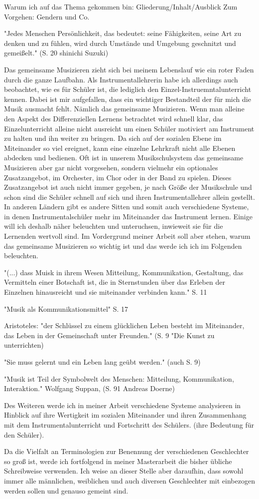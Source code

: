 

Warum ich auf das Thema gekommen bin:
Gliederung/Inhalt/Ausblick
Zum Vorgehen: Gendern und Co. 


"Jedes Menschen Persönlichkeit, das bedeutet: seine Fähigkeiten, seine Art zu
denken und zu fühlen, wird durch Umstände und Umgebung geschnitzt und
gemeißelt." (S. 20 shinichi Suzuki)

Das gemeinsame Musizieren zieht sich bei meinem Lebenslauf wie ein roter Faden
durch die ganze Laufbahn. Als Instrumentallehrerin habe ich allerdings auch
beobachtet, wie es für Schüler ist, die lediglich den
Einzel-Instruemntalunterricht kennen. Dabei ist mir aufgefallen, dass ein
wichtiger Bestandteil der für mich die Musik ausmacht fehlt. Nämlich das
gemeinsame Musizieren. Wenn man alleine den Aspekt des
Differenziellen Lernens betrachtet wird schnell klar, das Einzelunterricht
alleine nicht ausreicht um einen Schüler motiviert am Instrument zu halten und
ihn weiter zu bringen. Da sich auf der sozialen Ebene im Miteinander so viel
ereignet, kann eine einzelne Lehrkraft nicht alle Ebenen abdecken und bedienen.
Oft ist in unserem Musikschulsystem das gemeinsame Musizieren aber gar nicht
vorgesehen, sondern vielmehr ein optionales Zusatzangebot, im Orchester, im Chor
oder in der Band zu spielen. Dieses Zusatzangebot ist auch nicht immer gegeben,
je nach Größe der Musikschule und schon sind die Schüler schnell auf sich und
ihren Instrumentallehrer allein gestellt. In anderen Ländern gibt es andere
Sitten und somit auch verschiedene Systeme, in denen Instrumentalschüler mehr im
Miteinander das Instrument lernen. Einige will ich deshalb näher beleuchten und
unteruchsen, inwieweit sie für die Lernenden wertvoll sind. Im Vordergrund
meiner Arbeit soll aber stehen, warum das gemeinsame Musizieren so
wichtig ist und das werde ich ich im Folgenden beleuchten. 


"(...) dass Muisk in ihrem Wesen Mitteilung, Kommunikation, Gestaltung, das
Vermitteln einer Botschaft ist, die in Sternstunden über das Erleben der
Einzelnen hinausreicht und sie miteinander verbinden kann." S. 11

"Musik als Kommunikationsmittel" S. 17

Aristoteles: "der Schlüssel zu einem glücklichen Leben besteht im Miteinander,
das Leben in der Gemeinschaft unter Freunden." (S. 9 "Die Kunst zu unterrichten)

"Sie muss gelernt und ein Leben lang geübt werden." (auch S. 9)


"Musik ist Teil der Symbolwelt des Menschen: Mitteilung, Kommunikation,
Interaktion." Wolfgang Suppan, (S. 91 Andreas Doerne)

Des Weiteren werde ich in meiner Arbeit verschiedene Systeme analysieren in
Hinblick auf ihre Wertigkeit im sozialen Miteinander und ihren Zusammenhang mit
dem Instrumentalunterricht und Fortschritt des Schülers. (ihre Bedeutung für den
Schüler). 

Da die Vielfalt an Terminologien zur Benennung der verschiedenen
Geschlechter so groß ist, werde ich fortfolgend in meiner Masterarbeit die
bisher übliche Schreibweise verwenden. Ich weise an dieser Stelle aber
daraufhin, dass sowohl immer alle männlichen, weiblichen und auch diversen
Geschlechter mit einbezogen werden sollen und genauso gemeint sind. 
